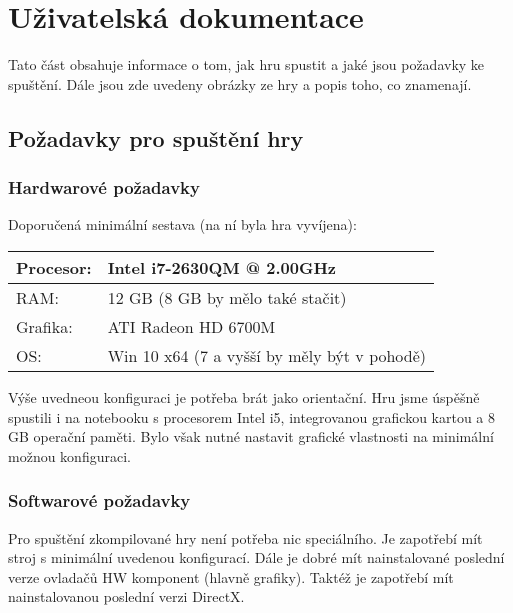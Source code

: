 
\chapter{Uživatelská dokumentace}

Tato část obsahuje informace o tom, jak hru spustit a jaké jsou požadavky ke spuštění. Dále jsou zde uvedeny obrázky ze hry a popis toho, co znamenají. 

\section{Požadavky pro spuštění hry}
\subsection{Hardwarové požadavky}

Doporučená minimální sestava (na ní byla hra vyvíjena): 

\begin{center}
	\begin{tabular} { | l | l |}
		\hline
		Procesor: 	&	Intel i7-2630QM @ 2.00GHz \\	\hline
		RAM:		&	12 GB	(8 GB by mělo také stačit) \\	\hline
		Grafika:	&	ATI Radeon HD 6700M \\	\hline
		OS:			&	Win 10 x64	(7 a vyšší by měly být v pohodě) \\
		\hline
	\end{tabular}
\end{center}

Výše uvedneou konfiguraci je potřeba brát jako orientační. Hru jsme úspěšně spustili i na notebooku s procesorem Intel i5, integrovanou grafickou kartou a 8 GB operační paměti. Bylo však nutné nastavit grafické vlastnosti na minimální možnou konfiguraci. 

\subsection{Softwarové požadavky}

Pro spuštění zkompilované hry není potřeba nic speciálního. Je zapotřebí mít stroj s minimální uvedenou konfigurací. Dále je dobré mít nainstalované poslední verze ovladačů HW komponent (hlavně grafiky).
Taktéž je zapotřebí mít nainstalovanou poslední verzi DirectX. 




%
%
%
%
%
%
%
%
%
%

